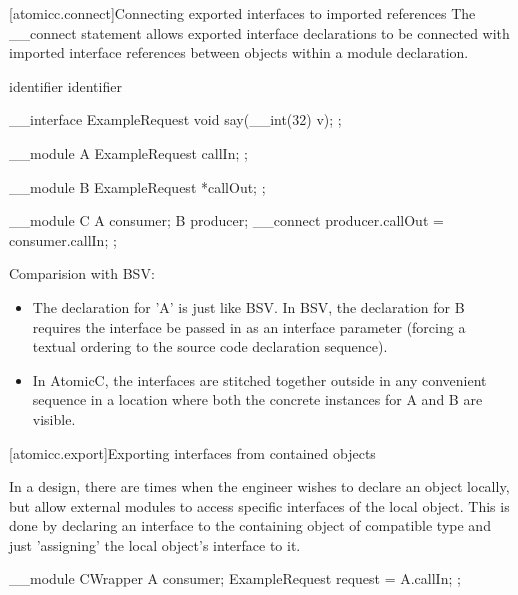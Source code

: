 [atomicc.connect]{Connecting exported interfaces to imported references}
The __connect statement allows exported interface declarations to be connected
with imported interface references between objects within a module declaration.

\begin{bnf}
\br
     identifier \terminal{=} identifier \terminal{;}
\end{bnf}

\begin{example}
\begin{codeblock}
     __interface ExampleRequest {
         void say(__int(32) v);
     };

     __module A {
          ExampleRequest callIn;
     };

     __module B {
         ExampleRequest *callOut;
     };

     __module C {
         A consumer;
         B producer;
         __connect producer.callOut = consumer.callIn;
     };
\end{codeblock}
\end{example}

Comparision with BSV:
\begin{itemize}
\item The declaration for 'A' is just like BSV.
In BSV, the declaration for B requires the interface be passed in as
an interface parameter (forcing a textual ordering to the source code
declaration sequence).
\item In AtomicC, the interfaces are stitched together outside in any
convenient sequence in a location where both the concrete instances
for A and B are visible.
\end{itemize}

[atomicc.export]{Exporting interfaces from contained objects}

In a design, there are times when the engineer wishes to declare an object locally,
but allow external modules to access specific interfaces of the local object.
This is done by declaring an interface to the containing object of compatible
type and just 'assigning' the local object's interface to it.

\begin{example}
\begin{codeblock}
     __module CWrapper {
         A consumer;
         ExampleRequest request = A.callIn;
      };
\end{codeblock}
\end{example}

